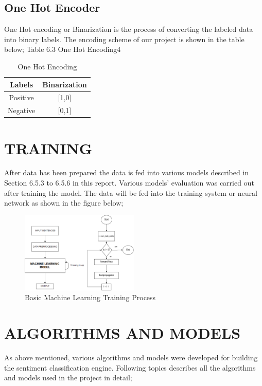             \subsection{One Hot Encoder}
One Hot encoding or Binarization is the process of converting the labeled data into
binary labels. The encoding scheme of our project is shown in the table below;
Table 6.3 One Hot Encoding4
        \begin{table}[hbt!]
            \centering
            \caption{One Hot Encoding}
            \begin{tabular}{|c|c|}
                \hline
                \textbf{Labels}   & \textbf{Binarization} \\ \hline
                Positive & {[}1,0{]}   \\ \hline
                Negative & {[}0,1{]}   \\ \hline
            \end{tabular}
        \end{table}

        \section{TRAINING}
After data has been prepared the data is fed into various models described in Section
6.5.3 to 6.5.6 in this report. Various models’ evaluation was carried out after training
the model. The data will be fed into the training system or neural network as shown in
the figure below;
        \begin{figure}[hbt!]
            \centering
                \includegraphics[width=0.5\textwidth]{./img/6.9.png}
                \caption{Basic Machine Learning Training Process}
        \end{figure}
        \section{ALGORITHMS AND MODELS}
As above mentioned, various algorithms and models were developed for building the
sentiment classification engine. Following topics describes all the algorithms and
models used in the project in detail;
